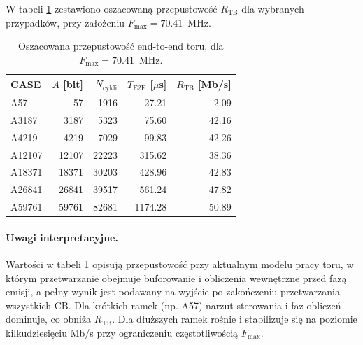 W tabeli \ref{tab:pdsch_throughput_tb} zestawiono oszacowaną przepustowość $R_{\mathrm{TB}}$ dla wybranych przypadków,
przy założeniu $F_{\max}=70.41$~MHz.

\begin{table}[!ht]
\centering
\caption{Oszacowana przepustowość end-to-end toru, dla $F_{\max}=70.41$~MHz.}
\label{tab:pdsch_throughput_tb}
\begin{tabular}{lrrrr}
\hline
CASE & $A$ [bit] & $N_{\mathrm{cykli}}$ & $T_{\mathrm{E2E}}$ [$\mu$s] & $R_{\mathrm{TB}}$ [Mb/s] \\
\hline
A57     & 57    & 1916  & 27.21  & 2.09 \\
A3187   & 3187  & 5323  & 75.60  & 42.16 \\
A4219   & 4219  & 7029  & 99.83  & 42.26 \\
A12107  & 12107 & 22223 & 315.62 & 38.36 \\
A18371  & 18371 & 30203 & 428.96 & 42.83 \\
A26841  & 26841 & 39517 & 561.24 & 47.82 \\
A59761  & 59761 & 82681 & 1174.28 & 50.89 \\
\hline
\end{tabular}
\end{table}

\paragraph{Uwagi interpretacyjne.}
Wartości w tabeli \ref{tab:pdsch_throughput_tb} opisują przepustowość przy aktualnym modelu pracy toru,
w którym przetwarzanie obejmuje buforowanie i obliczenia wewnętrzne przed fazą emisji,
a pełny wynik jest podawany na wyjście po zakończeniu przetwarzania wszystkich CB.
Dla krótkich ramek (np. A57) narzut sterowania i faz obliczeń dominuje, co obniża $R_{\mathrm{TB}}$.
Dla dłuższych ramek  rośnie i stabilizuje się na poziomie kilkudziesięciu Mb/s
przy ograniczeniu częstotliwością $F_{\max}$.




